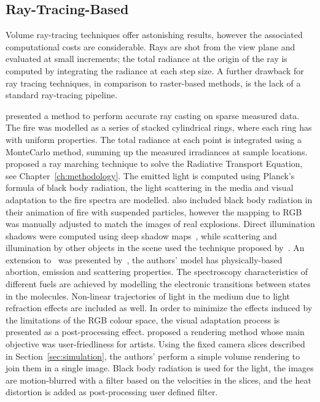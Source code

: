 \subsection{Ray-Tracing-Based}
\label{sec:ray_tracing_based}

Volume ray-tracing techniques offer astonishing results, however the associated computational costs are considerable.
Rays are shot from the view plane and evaluated at small increments; the total radiance at the origin of the ray is computed by integrating the radiance at each step size.
A further drawback for ray tracing techniques, in comparison to raster-based methods, is the lack of a standard ray-tracing pipeline.

\cite{Rushmeier:1995} presented a method to perform accurate ray casting on sparse measured data.
The fire was modelled as a series of stacked cylindrical rings, where each ring has with uniform properties.
The total radiance at each point is integrated using a MonteCarlo method, summing up the measured irradiances at sample locations. 
\cite{Nguyen:2002} proposed a ray marching technique to solve the Radiative Transport Equation, see Chapter~\ref{ch:methodology}.
The emitted light is computed using Planck's formula of black body radiation, the light scattering in the media and visual adaptation to the fire spectra are modelled.
\cite{Feldman:2003} also included black body radiation in their animation of fire with suspended particles, however the mapping to RGB was manually adjusted to match the images of real explosions.
Direct illumination shadows were computed using deep shadow maps~\cite{Lokovic:2000}, while scattering and illumination by other objects in the scene used the technique proposed by~\cite{Jensen:2002}.
An extension to~\cite{Nguyen:2002} was presented by~\cite{Pegoraro:2006}, the authors' model has physically-based abortion, emission and scattering properties.
The spectroscopy characteristics of different fuels are achieved by modelling the electronic transitions between states in the molecules.
Non-linear trajectories of light in the medium due to light refraction effects are included as well.
In order to minimize the effects induced by the limitations of the RGB colour space, the visual adaptation process is presented as a post-processing effect.
\cite{Horvath:2009} proposed a rendering method whose main objective was user-friedliness for artists.
Using the fixed camera slices described in Section~\ref{sec:simulation}, the authors' perform a simple volume rendering to join them in a single image.
Black body radiation is used for the light, the images are motion-blurred with a filter based on the velocities in the slices, and the heat distortion is added as post-processing user defined filter. 